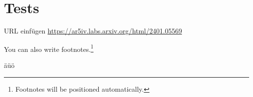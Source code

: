 

%


\section*{Tests}


URL einfügen \url{https://ar5iv.labs.arxiv.org/html/2401.05569}


You can also write footnotes.\footnote{Footnotes will be positioned automatically.}

äüö
